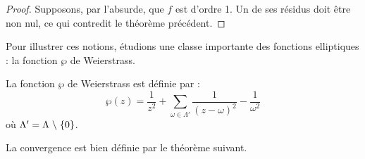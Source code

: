 \documentclass[a4paper]{article}
\begin{document}
\begin{proof}
Supposons, par l'absurde, que $f$ est d'ordre 1. Un de ses résidus doit être non nul, ce qui contredit le théorème précédent.
\end{proof}

\noindent Pour illustrer ces notions, étudions une classe importante des fonctions elliptiques : la fonction $\wp$ de Weierstrass.

\begin{definition}
La fonction $\wp$ de Weierstrass est définie par :
\begin{equation*}
\wp(z)=\frac{1}{z^2}+\sum \limits_{\omega \in \Lambda'} \frac{1}{(z-\omega)^2}-\frac{1}{\omega^2}
\end{equation*}
où $\Lambda'=\Lambda \hspace{0.1cm} \backslash \hspace{0.1cm} \{0\}$.
\end{definition}

\noindent La convergence est bien définie par le théorème suivant.
\end{document}
